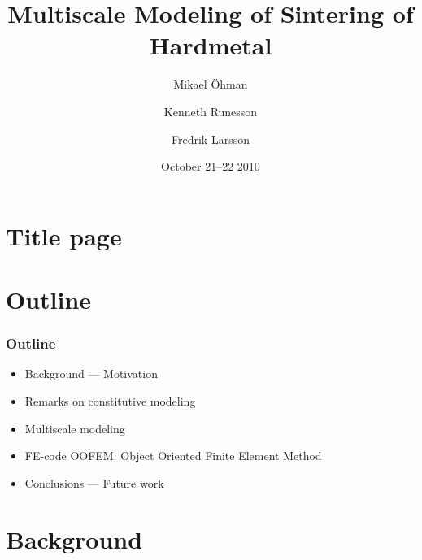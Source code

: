 \documentclass[11pt,mathserif]{beamer}
\title{Multiscale Modeling of Sintering of Hardmetal}
\author[Mikael Öhman et al.]{Mikael Öhman \and Kenneth Runesson \and Fredrik Larsson}
\institute{Dept. of Applied Mechanics\\ Chalmers University of Technology}
\date{October 21--22 2010}
\newcommand{\roughcite}[1]{\textsc{#1}}
\begin{document}
\section{Title page}
\begin{frame}[plain]
 \titlepage
\end{frame}

\section{Outline}
\begin{frame}
 \frametitle{Outline}

\begin{itemize}
 \item Background --- Motivation
 \item Remarks on constitutive modeling
 \item Multiscale modeling
 \item FE-code OOFEM: Object Oriented Finite Element Method
 \item Conclusions --- Future work
\end{itemize}
\end{frame}

\section{Background}
% 
% 
\end{document}
